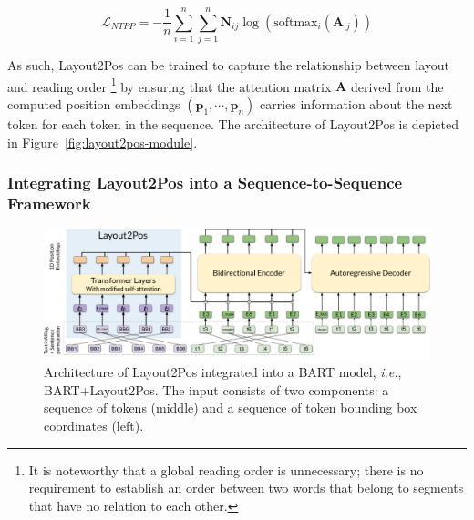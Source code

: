 \begin{equation}
  \mathcal{L}_{NTPP} = - \dfrac{1}{n} \sum_{i=1}^n \sum_{j=1}^n \bm{N}_{ij} \log\left(\textrm{softmax}_i(\bm{A}_{\cdot j})\right)
\end{equation}

\noindent As such, Layout2Pos can be trained to capture the relationship between layout and reading order \footnote{It is noteworthy that a global reading order is unnecessary; there is no requirement to establish an order between two words that belong to segments that have no relation to each other.} by ensuring that the attention matrix $\bm{A}$ derived from the computed position embeddings $(\bm{p}_1, \cdots, \bm{p}_n)$ carries information about the next token for each token in the sequence. The architecture of Layout2Pos is depicted in Figure~\ref{fig:layout2pos-module}. 


\subsubsection{Integrating Layout2Pos into a Sequence-to-Sequence Framework}

\begin{figure}
  \centering
  \includegraphics[width=\textwidth]{images/chapter4/Layout2Pos+BART.pdf}
  \caption{Architecture of Layout2Pos integrated into a BART model, \textit{i.e.}, BART+Layout2Pos. The input consists of two components: a sequence of tokens (middle) and a sequence of token bounding box coordinates (left).}
  \label{fig:layout2pos-ed}
\end{figure}


